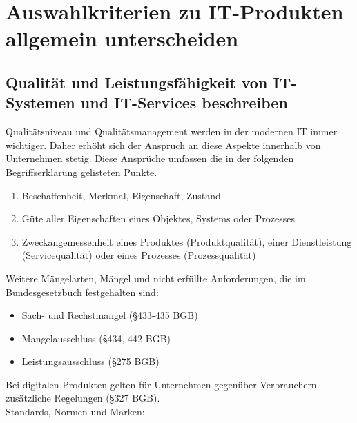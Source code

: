 \section{Auswahlkriterien zu IT-Produkten allgemein unterscheiden}
\subsection{Qualität und Leistungsfähigkeit von IT-Systemen und IT-Services beschreiben}
    \begin{subindent}
        Qualitätsniveau und Qualitätsmanagement werden in der modernen IT immer wichtiger.
        Daher erhöht sich der Anspruch an diese Aspekte innerhalb von Unternehmen stetig. Diese Ansprüche umfassen die in der folgenden Begriffserklärung gelisteten Punkte.
    \end{subindent}

    \begin{tcolorbox}[width=13cm, center, title=Qualitätsbegriff, coltitle=white, colframe=white!20!blue, colback=white!80!blue]
        \begin{enumerate}[itemsep=0.01em, parsep=0.3em]
            \item Beschaffenheit, Merkmal, Eigenschaft, Zustand
            \item Güte aller Eigenschaften eines Objektes, Systems oder Prozesses
            \item Zweckangemessenheit eines Produktes (Produktqualität), einer Dienstleistung (Servicequalität) oder eines Prozesses (Prozessqualität)
        \end{enumerate}
    \end{tcolorbox}

    \begin{subindent}
        Weitere Mängelarten, Mängel und nicht erfüllte Anforderungen, die im Bundesgesetzbuch festgehalten sind:
    \end{subindent}

    \begin{itemize}[leftmargin=2.5cm, topsep=0.3em, itemsep=0.1em, parsep=0.5em]
        \item Sach- und Rechstmangel (§433-435 BGB)
        \item Mangelausschluss (§434, 442 BGB)
        \item Leistungsausschluss (§275 BGB)
    \end{itemize}

    \begin{subindent}
        Bei digitalen Produkten gelten für Unternehmen gegenüber Verbrauchern zusätzliche Regelungen (§327 BGB). \\
        Standards, Normen und Marken:
    \end{subindent}

